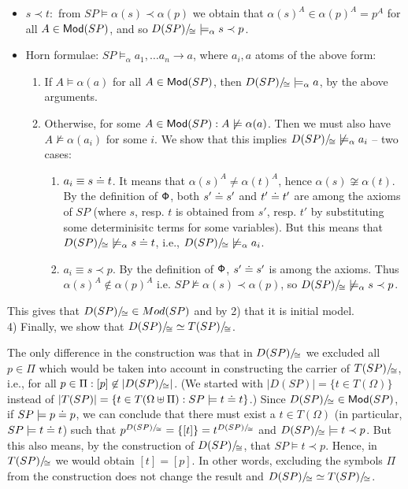 \documentclass[10pt]{article}
\begin{document}
\begin{PROOF}
\begin{itemize}
 	\item $s\prec t:$ from $SP \models \alpha(s) \prec \alpha(p)$
we obtain that $\alpha (s)^A \in \alpha (p)^A=p^A$ for all $A\in{\sf {Mod}}(SP)$, and so
 ${D(SP)/\!_{\cong}} \models_{\alpha} s \prec p$.
	\item Horn formulae: $SP \models_{\alpha} a_1, \ldots a_n \to a$, where $a_i, a$ atoms 
of the above form: 
\begin{enumerate}
	\item If $A \models \alpha(a)$ for all $A\in{\sf {Mod}}(SP)$, then 
${D(SP)/\!_{\cong}} \models_{\alpha} a$, by the above arguments.
	\item Otherwise, for some $A\in{\sf {Mod}}(SP):A \not\models \alpha(a)$. Then we
	must also have $A\not\models \alpha(a_i)$ for some $i$. We show that
	this implies
${D(SP)/\!_{\cong}} \not\models_{\alpha} a_i$ -- two cases:
			\begin{enumerate}
			\item $a_i\equiv s \mathrel{\dot{=} } t$. It means that $\alpha (s)^A 
\not= \alpha (t)^A$, hence $\alpha (s) \not\cong \alpha (t)$. By the
definition of ${\sf {\Phi}}$, both $s'\mathrel{\dot{=} } s'$ and $t'\mathrel{\dot{=} } t'$ are among the axioms
of $SP$ (where $s$, resp. $t$ is obtained from $s'$, resp. $t'$ by
substituting some determinisitc terms for some variables). But this means that
${D(SP)/\!_{\cong}} \not\models_{\alpha} s \mathrel{\dot{=} } t$, i.e.,
$D(SP)/\!_{\cong}\not\models_\alpha a_i$.
			\item $a_i\equiv s \prec p$. By the definition of
			${\sf {\Phi}}$, $s'\mathrel{\dot{=} } s'$ is among the axioms. Thus $\alpha (s)^A
\not\in \alpha (p)^A$ i.e. $SP \not\models \alpha(s) \prec \alpha(p)$, so 
${D(SP)/\!_{\cong}} \not\models_{\alpha} s \prec p$.
			\end{enumerate}
		\end{enumerate}
	\end{itemize}
This gives that ${D(SP)/\!_{\cong}} \in Mod(SP)$ and by 2) that it is initial model.
\\[1ex]
4) Finally, we show that ${D(SP)/\!_{\cong}} 
\simeq {T(SP)/\!_{\cong}}$.

The only difference in the construction was that in $D(SP)/\!_{\cong}$ we
excluded all $p\in\Pi$ which would be taken into account in constructing the
carrier of $T(SP)/\!_{\cong}$, i.e., 
for all $p\in\Pi:[p]\not\in|D(SP)/\!_{\cong}|$. 
(We started with $|D(SP)|=\{t\in T(\Omega)\}$ instead of $|T(SP)|=\{t\in
T(\Omega\uplus\Pi):SP\models t\mathrel{\dot{=} } t\}$.)
Since
$D(SP)/\!_{\cong}\in{\sf {Mod}}(SP)$,  if $SP\models p\mathrel{\dot{=} } p$,
we can conclude that there must exist a $t\in T(\Omega)$ (in particular,
$SP\models t\mathrel{\dot{=} } t$) such that
$p^{D(SP)/\!_{\cong}}=\{[t]\}=t^{D(SP)/\!_{\cong}}$ and $D(SP)/\!_{\cong}\models t\prec p$.
But this also means, by the construction of
$D(SP)/\!_{\cong}$, that $SP\models t\prec p$. Hence, in $T(SP)/\!_{\cong}$ we
would obtain $[t]=[p]$. In other words, excluding the symbols $\Pi$ from the
construction does not change the result and $D(SP)/\!_{\cong}\simeq T(SP)/\!_{\cong}$.
\end{PROOF}
\end{document}
